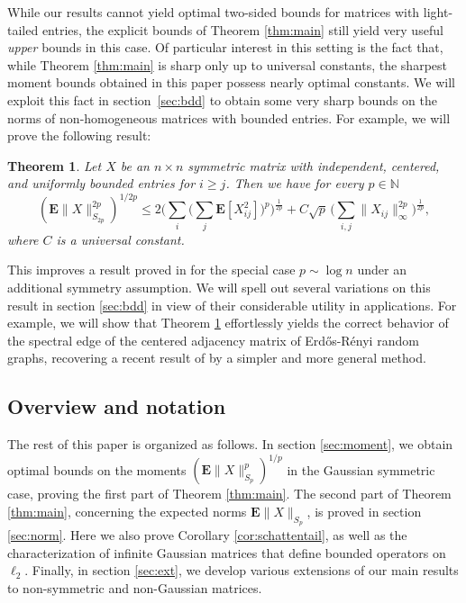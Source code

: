 \documentclass[10pt,reqno]{amsart}
\newtheorem{thm}{Theorem}[section]
\theoremstyle{definition}
\numberwithin{equation}{section}
\numberwithin{figure}{section}
\numberwithin{table}{section}
\begin{document}
While our results cannot yield optimal two-sided bounds for matrices with 
light-tailed entries, the explicit bounds of Theorem \ref{thm:main} still 
yield very useful \emph{upper} bounds in this case. Of particular interest 
in this setting is the fact that, while Theorem \ref{thm:main} is sharp 
only up to universal constants, the sharpest moment bounds obtained in 
this paper possess nearly optimal constants. We will exploit this 
fact in section~\ref{sec:bdd} to obtain some very sharp bounds on the 
norms of non-homogeneous matrices with bounded entries. For example, we 
will prove the following result:

\begin{thm}
\label{thm:bmain}
Let $X$ be an $n\times n$ symmetric matrix with independent, 
centered, and uniformly bounded entries for $i\ge j$. Then we have for 
every $p\in\mathbb{N}$
$$
	(\mathbf{E}\|X\|_{S_{2p}}^{2p})^{1/2p} \le
	2\Bigg(\sum_i\Bigg(\sum_j 
	\mathbf{E}[X_{ij}^2]\Bigg)^p\Bigg)^{\frac{1}{2p}}
	+C\sqrt{p}\,
	\Bigg(\sum_{i,j}
	\|X_{ij}\|_\infty^{2p}\Bigg)^{\frac{1}{2p}},
$$
where $C$ is a universal constant.
\end{thm}

This improves a result proved in \cite{BvH16} for the special case 
$p\sim\log n$ under an additional symmetry assumption. We will spell out 
several variations on this result in section \ref{sec:bdd} in view of 
their considerable utility in applications. For example, we will show that 
Theorem \ref{thm:bmain} effortlessly yields the correct behavior of the 
spectral edge of the centered adjacency matrix of Erd\H{o}s-R\'enyi random 
graphs, recovering a recent result of \cite{BBK17} by a simpler and more 
general method.

\subsection{Overview and notation}
\label{sec:notation}

The rest of this paper is organized as follows. In section 
\ref{sec:moment}, we obtain optimal bounds on the moments 
$(\mathbf{E}\|X\|_{S_p}^p)^{1/p}$ in the Gaussian symmetric case, proving 
the first part of Theorem \ref{thm:main}. The second part of Theorem 
\ref{thm:main}, concerning the expected norms $\mathbf{E}\|X\|_{S_p}$, is 
proved in section \ref{sec:norm}. Here we also prove Corollary 
\ref{cor:schattentail}, as well as the characterization of infinite 
Gaussian matrices that define bounded operators on $\ell_2$. Finally, in 
section \ref{sec:ext}, we develop various extensions of our main results 
to non-symmetric and non-Gaussian matrices.
\end{document}
